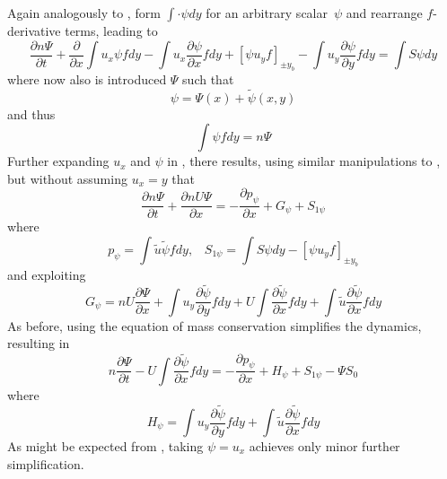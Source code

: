 Again analogously to , form $\int \cdot \psi dy$ for an arbitrary  scalar~$\psi$
and rearrange $f$-derivative terms, leading to
\begin{equation}\label{eq:scalcons2}
\frac{\partial  n\Psi}{\partial t}  +  \frac{\partial}{\partial x} \int u_x \psi f dy-  \int u_x  \frac{\partial \psi}{\partial x} f dy+ [ \psi u_y f ]_{\pm y_b}  - \int u_y \frac{\partial \psi}{\partial y} f dy= \int S \psi dy
\end{equation}
where now also is introduced $\Psi$ such that
\begin{equation}\label{eq:qsplit}
\psi = \Psi(x) + \tilde{\psi} (x,y)
\end{equation}
and thus
\begin{equation}\label{eq:qsplitf}
\int \psi f dy  = n \Psi
\end{equation}
Further expanding $u_x$ and $\psi$ in , there results, using similar manipulations
to , but without assuming $u_x=y$ that
\begin{equation}\label{eq:scalcon2}
 \frac{\partial n\Psi}{\partial t}  +  \frac{\partial  nU \Psi }{\partial x} = -  \frac{\partial p_\psi}{\partial x} + G_\psi + S_{1\psi}
\end{equation}
where
\begin{equation}
p_\psi= \int \tilde{u} \tilde{\psi}  f dy,\;\;\; S_{1\psi} = \int S \psi dy-[ \psi u_y f ]_{\pm y_b}
\end{equation}
and exploiting 
\begin{equation}
G_\psi= n U  \frac{\partial \Psi}{\partial x} + \int u_y \frac{\partial \tilde{\psi}}{\partial y} f dy +
 U \int \frac{\partial \tilde{\psi}}{\partial x} f dy+    \int \tilde{u} \frac{ \partial \tilde{\psi}}{\partial x} f dy
\end{equation}
As before, using the equation of mass conservation simplifies the dynamics, resulting in
\begin{equation}\label{eq:scalcon}
n\frac{\partial \Psi}{\partial t}  -U \int \frac{\partial \tilde{\psi}}{\partial x} f dy 
 = -  \frac{\partial p_\psi}{\partial x} + H_\psi + S_{1\psi} - \Psi S_{0}
\end{equation}
where
\begin{equation}
H_\psi= \int u_y \frac{\partial \tilde{\psi}}{\partial y} f dy + \int \tilde{u} \frac{ \partial \tilde{\psi}}{\partial x} f dy
\end{equation}
As might be expected from , taking $\psi=u_x$ achieves only minor further simplification.

